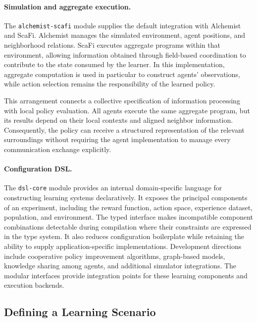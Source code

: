\paragraph{Simulation and aggregate execution.}
The \texttt{alchemist-\allowbreak scafi} module supplies the default integration with
 Alchemist and ScaFi.
%
Alchemist manages the simulated environment, agent positions, and
 neighborhood relations.
%
ScaFi executes aggregate programs within that environment, allowing
 information obtained through field-based coordination to contribute to
 the state consumed by the learner.
%
In this implementation, aggregate computation is used in particular to
 construct agents' observations, while action selection remains the
 responsibility of the learned policy.

This arrangement connects a collective specification of information
 processing with local policy evaluation.
%
All agents execute the same aggregate program, but its results depend
 on their local contexts and aligned neighbor information.
%
Consequently, the policy can receive a structured representation of the
 relevant surroundings without requiring the agent implementation to
 manage every communication exchange explicitly.

\paragraph{Configuration DSL.}
The \texttt{dsl-\allowbreak core} module provides an internal domain-specific language
 for constructing learning systems declaratively.
%
It exposes the principal components of an experiment, including the
 reward function, action space, experience dataset, population, and
 environment.
%
The typed interface makes incompatible component combinations detectable
 during compilation where their constraints are expressed in the type system.
%
It also reduces configuration boilerplate while retaining the ability to
 supply application-specific implementations.
%
Development directions include cooperative policy improvement algorithms,
 graph-based models, knowledge sharing among agents, and additional
 simulator integrations.
%
The modular interfaces provide integration points for these learning
 components and execution backends.

\subsection{Defining a Learning Scenario}
\label{sec:scarlib-scenario}

